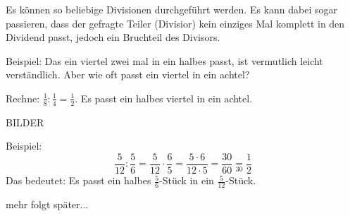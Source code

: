 Es können so beliebige Divisionen durchgeführt werden. Es kann dabei sogar passieren, dass der gefragte Teiler (Divisior) kein einziges Mal komplett in den Dividend passt, jedoch ein Bruchteil des Divisors.

Beispiel: Das ein viertel zwei mal in ein halbes passt, ist vermutlich leicht verständlich. Aber wie oft passt ein viertel in ein achtel?

Rechne: $\frac{1}{8}:\frac{1}{4}=\frac{1}{2}$. Es passt ein halbes viertel in ein achtel.

BILDER


Beispiel:
\begin{equation*}
	\frac{5}{12}:\frac{5}{6}= \frac{5}{12}\cdot \frac{6}{5}=\frac{5\cdot 6}{12\cdot 5}= \frac{30}{60}\underset{30}{=}\frac{1}{2}
\end{equation*}
Das bedeutet: Es passt ein halbes $\frac{5}{6}$-Stück in ein $\frac{5}{12}$-Stück.

mehr folgt später... 